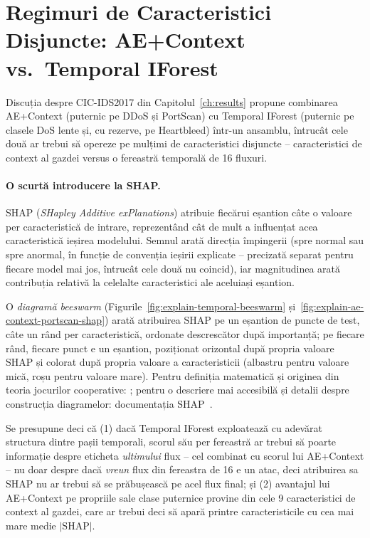 \section{Regimuri de Caracteristici Disjuncte: AE+Context vs.\ Temporal IForest}
\label{sec:explain-disjoint-regime}

Discuția despre CIC-IDS2017 din Capitolul~\ref{ch:results} propune combinarea AE+Context (puternic pe DDoS și PortScan) cu Temporal IForest (puternic pe clasele DoS lente și, cu rezerve, pe Heartbleed) într-un ansamblu, întrucât cele două ar trebui să opereze pe mulțimi de caracteristici disjuncte -- caracteristici de context al gazdei versus o fereastră temporală de 16 fluxuri.

\paragraph{O scurtă introducere la SHAP.} SHAP (\emph{SHapley Additive exPlanations}) atribuie fiecărui eșantion câte o valoare per caracteristică de intrare, reprezentând cât de mult a influențat acea caracteristică ieșirea modelului. Semnul arată direcția împingerii (spre normal sau spre anormal, în funcție de convenția ieșirii explicate -- precizată separat pentru fiecare model mai jos, întrucât cele două nu coincid), iar magnitudinea arată contribuția relativă la celelalte caracteristici ale aceluiași eșantion.

O \emph{diagramă beeswarm} (Figurile~\ref{fig:explain-temporal-beeswarm} și~\ref{fig:explain-ae-context-portscan-shap}) arată atribuirea SHAP pe un eșantion de puncte de test, câte un rând per caracteristică, ordonate descrescător după importanță; pe fiecare rând, fiecare punct e un eșantion, poziționat orizontal după propria valoare SHAP și colorat după propria valoare a caracteristicii (albastru pentru valoare mică, roșu pentru valoare mare). Pentru definiția matematică și originea din teoria jocurilor cooperative: \parencite{lundberg2017unified}; pentru o descriere mai accesibilă și detalii despre construcția diagramelor: documentația SHAP~\cite{shap_docs}.

Se presupune deci că (1) dacă Temporal IForest exploatează cu adevărat structura dintre pașii temporali, scorul său per fereastră ar trebui să poarte informație despre eticheta \emph{ultimului} flux -- cel combinat cu scorul lui AE+Context -- nu doar despre dacă \emph{vreun} flux din fereastra de 16 e un atac, deci atribuirea sa SHAP nu ar trebui să se prăbușească pe acel flux final; și (2) avantajul lui AE+Context pe propriile sale clase puternice provine din cele 9 caracteristici de context al gazdei, care ar trebui deci să apară printre caracteristicile cu cea mai mare medie $|\text{SHAP}|$.

